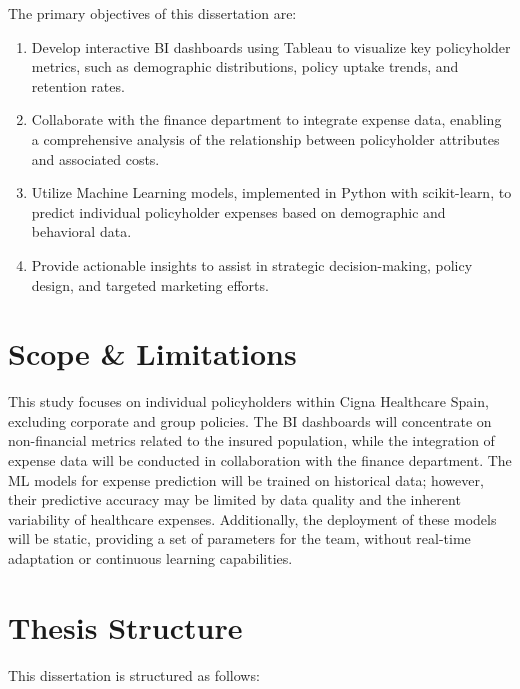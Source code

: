 The primary objectives of this dissertation are:

\begin{enumerate}
    \item Develop interactive BI dashboards using Tableau to visualize key policyholder metrics, such as demographic distributions, policy uptake trends, and retention rates.
    \item Collaborate with the finance department to integrate expense data, enabling a comprehensive analysis of the relationship between policyholder attributes and associated costs.
    \item Utilize Machine Learning models, implemented in Python with scikit-learn, to predict individual policyholder expenses based on demographic and behavioral data.
    \item Provide actionable insights to assist in strategic decision-making, policy design, and targeted marketing efforts.
\end{enumerate}

\section{Scope \& Limitations}

This study focuses on individual policyholders within Cigna Healthcare Spain, excluding corporate and group policies. The BI dashboards will concentrate on non-financial metrics related to the insured population, while the integration of expense data will be conducted in collaboration with the finance department. The ML models for expense prediction will be trained on historical data; however, their predictive accuracy may be limited by data quality and the inherent variability of healthcare expenses. Additionally, the deployment of these models will be static, providing a set of parameters for the team, without real-time adaptation or continuous learning capabilities.

\section{Thesis Structure}

This dissertation is structured as follows:

